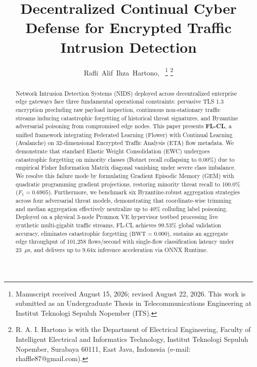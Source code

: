 \documentclass[journal,10pt,twocolumn]{IEEEtran}
\begin{document}
\title{Decentralized Continual Cyber Defense for Encrypted Traffic Intrusion Detection}

\author{Rafli~Alif~Ihza~Hartono,~
\thanks{Manuscript received August 15, 2026; revised August 22, 2026. This work is submitted as an Undergraduate Thesis in Telecommunications Engineering at Institut Teknologi Sepuluh Nopember (ITS).}
\thanks{R. A. I. Hartono is with the Department of Electrical Engineering, Faculty of Intelligent Electrical and Informatics Technology, Institut Teknologi Sepuluh Nopember, Surabaya 60111, East Java, Indonesia (e-mail: rhaffle87@gmail.com).}
}

\maketitle

\begin{abstract}
Network Intrusion Detection Systems (NIDS) deployed across decentralized enterprise edge gateways face three fundamental operational constraints: pervasive TLS 1.3 encryption precluding raw payload inspection, continuous non-stationary traffic streams inducing catastrophic forgetting of historical threat signatures, and Byzantine adversarial poisoning from compromised edge nodes. This paper presents \textbf{FL-CL}, a unified framework integrating Federated Learning (Flower) with Continual Learning (Avalanche) on 32-dimensional Encrypted Traffic Analysis (ETA) flow metadata. We demonstrate that standard Elastic Weight Consolidation (EWC) undergoes catastrophic forgetting on minority classes (Botnet recall collapsing to 0.00\%) due to empirical Fisher Information Matrix diagonal vanishing under severe class imbalance. We resolve this failure mode by formulating Gradient Episodic Memory (GEM) with quadratic programming gradient projections, restoring minority threat recall to 100.0\% ($F_1 = 0.6905$). Furthermore, we benchmark six Byzantine-robust aggregation strategies across four adversarial threat models, demonstrating that coordinate-wise trimming and median aggregation effectively neutralize up to 40\% colluding label poisoning. Deployed on a physical 3-node Proxmox VE hypervisor testbed processing live synthetic multi-gigabit traffic streams, FL-CL achieves 99.53\% global validation accuracy, eliminates catastrophic forgetting ($\text{BWT} = 0.000$), sustains an aggregate edge throughput of 101,258 flows/second with single-flow classification latency under 23~$\mu$s, and delivers up to 9.64x inference acceleration via ONNX Runtime.
\end{abstract}
\end{document}
